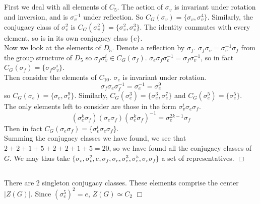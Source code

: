 \documentclass{article}
\begin{document}
\subsection{}
First we deal with all elements of $C_5$. The action of $\sigma_v$ is invariant under rotation and inversion, and is $\sigma_v^{-1}$ under reflection. So $C_G(\sigma_v) = \{\sigma_v, \sigma_v^4\}$. Similarly, the conjugacy class of $\sigma_v^2$ is $C_G(\sigma_v^2) = \{\sigma_v^2, \sigma_v^3\}$. The identity commutes with every element, so is in its own conjugacy class $\{e\}$.\\
Now we look at the elements of $D_5$. Denote a reflection by $\sigma_f$. $\sigma_f \sigma_v = \sigma_v^{-1}\sigma_f$ from the group structure of $D_5$ so $\sigma_f\sigma_v^i \in C_G(\sigma_f)$. $\sigma_e \sigma_f \sigma_e^{-1} = \sigma_f\sigma_v^{-1}$, so in fact $C_G(\sigma_f) = \{\sigma_f\sigma_v^{i}\}$.\\
Then consider the elements of $C_{10}$. $\sigma_e$ is invariant under rotation.
$$\sigma_f \sigma_e \sigma_f^{-1} = \sigma_e^{-1} = \sigma_e^{9}$$
so $C_G(\sigma_e) = \{\sigma_e, \sigma_e^{9} \}$. Similarly, $C_G(\sigma_e^3) = \{\sigma_e^3, \sigma_e^{7} \}$ and $C_G(\sigma_e^5) = \{\sigma_e^5\}$.\\
The only elements left to consider are those in the form $\sigma_v^i\sigma_e\sigma_f$.
$$(\sigma_e^k \sigma_f)(\sigma_e\sigma_f)(\sigma_e^k\sigma_f)^{-1} = \sigma_e^{2k-1}\sigma_f$$
Then in fact $C_G(\sigma_e\sigma_f) = \{\sigma_v^{i}\sigma_e\sigma_f\}$.\\
Summing the conjugacy classes we have found, we see that $2 + 2 + 1 + 5 + 2 + 2 + 1 + 5 = 20$, so we have found all the conjugacy classes of $G$. We may thus take $\{\sigma_v, \sigma_v^2, e, \sigma_f, \sigma_e, \sigma_e^3, \sigma_e^5, \sigma_e\sigma_f\}$ a set of representatives. $\Box$

\subsection{}
There are 2 singleton conjugacy classes. These elements comprise the center $|Z(G)|$. Since $(\sigma_e^5)^2 = e$, $Z(G) \simeq C_2$ $\Box$
\end{document}
